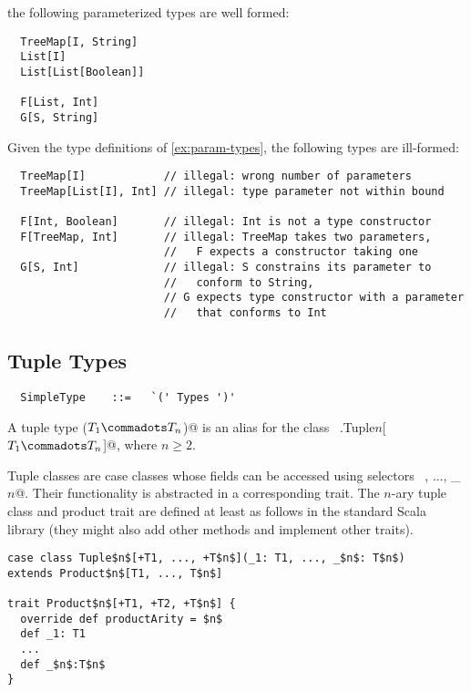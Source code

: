the following parameterized types are well formed:

\begin{lstlisting}
  TreeMap[I, String]
  List[I]
  List[List[Boolean]]
  
  F[List, Int]
  G[S, String]
\end{lstlisting}

\example Given the type definitions of \ref{ex:param-types},
the following types are ill-formed:

\begin{lstlisting}
  TreeMap[I]            // illegal: wrong number of parameters
  TreeMap[List[I], Int] // illegal: type parameter not within bound
  
  F[Int, Boolean]       // illegal: Int is not a type constructor
  F[TreeMap, Int]       // illegal: TreeMap takes two parameters,
                        //   F expects a constructor taking one
  G[S, Int]             // illegal: S constrains its parameter to
                        //   conform to String,
                        // G expects type constructor with a parameter
                        //   that conforms to Int
\end{lstlisting}

\subsection{Tuple Types}\label{sec:tuple-types}

\syntax\begin{lstlisting}
  SimpleType    ::=   `(' Types ')'
\end{lstlisting}

A tuple type \lstinline@($T_1 \commadots T_n$)@ is an alias for the
class ~\lstinline@scala.Tuple$n$[$T_1 \commadots T_n$]@, where $n \geq
2$.

Tuple classes are case classes whose fields can be accessed using
selectors ~, ..., \lstinline@_$n$@. Their functionality is
abstracted in a corresponding  trait. The $n$-ary tuple
class and product trait are defined at least as follows in the
standard Scala library (they might also add other methods and
implement other traits).

\begin{lstlisting}
case class Tuple$n$[+T1, ..., +T$n$](_1: T1, ..., _$n$: T$n$) 
extends Product$n$[T1, ..., T$n$]

trait Product$n$[+T1, +T2, +T$n$] {
  override def productArity = $n$
  def _1: T1
  ...
  def _$n$:T$n$
}
\end{lstlisting}

